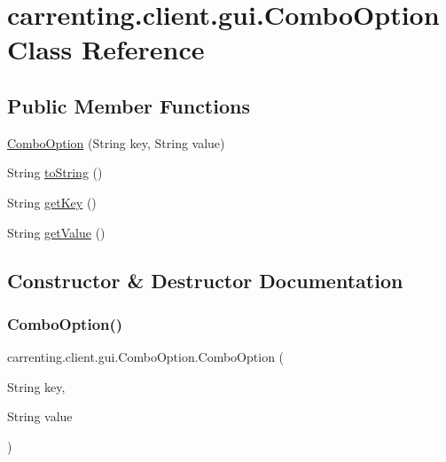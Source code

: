 \hypertarget{classcarrenting_1_1client_1_1gui_1_1_combo_option}{}\section{carrenting.\+client.\+gui.\+Combo\+Option Class Reference}
\label{classcarrenting_1_1client_1_1gui_1_1_combo_option}
\subsection*{Public Member Functions}
\begin{DoxyCompactItemize}
\item 
\mbox{\hyperlink{classcarrenting_1_1client_1_1gui_1_1_combo_option_a4857455bd110603bb765f4c83d59fd3f}{Combo\+Option}} (String key, String value)
\item 
String \mbox{\hyperlink{classcarrenting_1_1client_1_1gui_1_1_combo_option_ab988800ea25c9b73568f8860bd85393b}{to\+String}} ()
\item 
String \mbox{\hyperlink{classcarrenting_1_1client_1_1gui_1_1_combo_option_a8dd8eb94c6eb73f914706379815e1dbf}{get\+Key}} ()
\item 
String \mbox{\hyperlink{classcarrenting_1_1client_1_1gui_1_1_combo_option_aa305470a1e2867419c25ab82cd224d66}{get\+Value}} ()
\end{DoxyCompactItemize}


\subsection{Constructor \& Destructor Documentation}
\mbox{\label{classcarrenting_1_1client_1_1gui_1_1_combo_option_a4857455bd110603bb765f4c83d59fd3f}} 
\subsubsection{\texorpdfstring{ComboOption()}{ComboOption()}}
{\footnotesize\ttfamily carrenting.\+client.\+gui.\+Combo\+Option.\+Combo\+Option (\begin{DoxyParamCaption}\item[{String}]{key,  }\item[{String}]{value }\end{DoxyParamCaption})}



